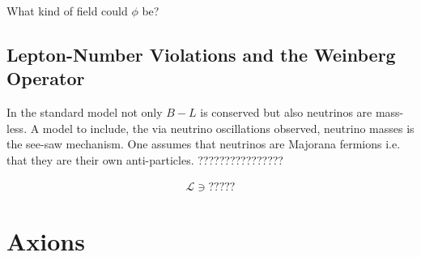 \documentclass[13pt,a4paper,twoside,titlepage]{article}
\begin{document}
\noindent
What kind of field could $\phi$ be?


\subsection{Lepton-Number Violations and the Weinberg Operator}
In the standard model not only $B - L$ is conserved but also neutrinos are mass-less.
A model to include, the via neutrino oscillations observed, neutrino masses is the see-saw mechanism.
One assumes that neutrinos are Majorana fermions i.e. that they are their own anti-particles.
????????????????

\label{sec:lapton_number_violations}




\begin{align}
    \mathcal{L} \ni ?????
\end{align}






\section{Axions}
\label{sec:axions}
\end{document}
